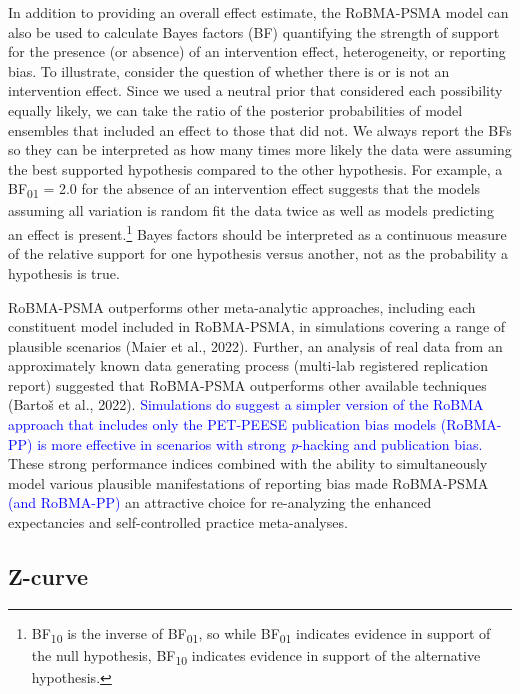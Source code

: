 \documentclass[
  man, donotrepeattitle,mask,floatsintext]{apa7}
\begin{document}
In addition to providing an overall effect estimate, the RoBMA-PSMA model can also be used to calculate Bayes factors (BF) quantifying the strength of support for the presence (or absence) of an intervention effect, heterogeneity, or reporting bias. To illustrate, consider the question of whether there is or is not an intervention effect. Since we used a neutral prior that considered each possibility equally likely, we can take the ratio of the posterior probabilities of model ensembles that included an effect to those that did not. We always report the BFs so they can be interpreted as how many times more likely the data were assuming the best supported hypothesis compared to the other hypothesis. For example, a BF\textsubscript{01} = 2.0 for the absence of an intervention effect suggests that the models assuming all variation is random fit the data twice as well as models predicting an effect is present.\footnote{BF\textsubscript{10} is the inverse of BF\textsubscript{01}, so while BF\textsubscript{01} indicates evidence in support of the null hypothesis, BF\textsubscript{10} indicates evidence in support of the alternative hypothesis.} Bayes factors should be interpreted as a continuous measure of the relative support for one hypothesis versus another, not as the probability a hypothesis is true.

RoBMA-PSMA outperforms other meta-analytic approaches, including each constituent model included in RoBMA-PSMA, in simulations covering a range of plausible scenarios (Maier et al., 2022). Further, an analysis of real data from an approximately known data generating process (multi-lab registered replication report) suggested that RoBMA-PSMA outperforms other available techniques (Bartoš et al., 2022). \textcolor{blue}{Simulations do suggest a simpler version of the RoBMA approach that includes only the PET-PEESE publication bias models (RoBMA-PP) is more effective in scenarios with strong \emph{p}-hacking and publication bias.} These strong performance indices combined with the ability to simultaneously model various plausible manifestations of reporting bias made RoBMA-PSMA \textcolor{blue}{(and RoBMA-PP)} an attractive choice for re-analyzing the enhanced expectancies and self-controlled practice meta-analyses.

\hypertarget{z-curve}{%
\subsection{Z-curve}\label{z-curve}}
\end{document}
